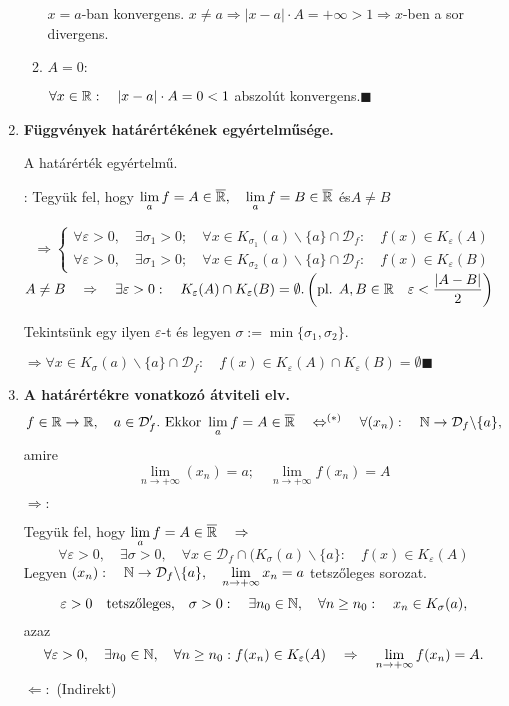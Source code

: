 \documentclass[a4paper,11.5pt]{article}
\begin{document}
\begin{enumerate}
\begin{enumerate}
			$ x=a$-ban konvergens. $x\not=a \Rightarrow |x-a|\cdot A=+\infty>1 \Rightarrow x$-ben a sor divergens.
			\item $A=0:$
			
			 $ \forall x\in\mathbb{R}:\quad |x-a|\cdot A=0<1$ abszolút konvergens.\quad $\blacksquare$
			
		\end{enumerate}
		
		\item \textbf{Függvények határértékének egyértelműsége.}
		
		A határérték egyértelmű.
		
		\biz: Tegyük fel, hogy $\displaystyle\lim_af=A\in\overline{\mathbb{R}}, \quad \lim_af=B\in \overline{\mathbb{R}}$ \quad és\quad  $A\not=B$
		
		\[\Rightarrow\left\{\begin{gathered}
			\forall \varepsilon>0, \quad \exists\sigma_1>0; \quad \forall x \in K_{\sigma_1}(a)\backslash\{a\}\cap \mathcal{D}_f:\quad f(x)\in K_{\varepsilon}(A)\\
			\forall \varepsilon>0, \quad \exists\sigma_1>0; \quad \forall x \in K_{\sigma_2}(a)\backslash\{a\}\cap \mathcal{D}_f:\quad f(x)\in K_{\varepsilon}(B)
		\end{gathered}\right.
		 \]
		$\displaystyle A\not=B\quad \Rightarrow\quad \exists\varepsilon>0:\quad K_\varepsilon(A)\cap K_\varepsilon(B)=\emptyset. \left(\text{pl. }A,B \in \mathbb{R} \quad \varepsilon<\displaystyle\frac{|A-B|}{2}\right)$
		
		Tekintsünk egy ilyen $\varepsilon$-t és legyen $\sigma:=\min\{\sigma_1,\sigma_2\}.$
		
		$\Rightarrow \forall x \in K_\sigma(a)\backslash\{a\}\cap\mathcal{D}_f:\quad f(x)\in K_\varepsilon(A)\cap K_\varepsilon(B)=\emptyset$\quad  {\LARGE\Lightning}\quad $\blacksquare$
		
		\item \textbf{A határértékre vonatkozó átviteli elv.}
		\[f\in\mathbb{R}\rightarrow\mathbb{R}, \quad a\in\mathcal{D}_f'.\text{ Ekkor }\lim_af=A\in\overline{\mathbb{R}}\quad \Leftrightarrow^{(*)}\quad \forall(x_n):\quad \mathbb{N}\to\mathcal{D}_f\backslash\{a\},\]
		amire
		\[\lim_{n\to+\infty}(x_n)=a;\quad \lim_{n\to+\infty}f(x_n)=A\]
		
		\biz $\Rightarrow:$
		
		Tegyük fel, hogy $\displaystyle\lim_af=A\in\overline{\mathbb{R}}\quad \Rightarrow$
		\[ \forall \varepsilon>0,\quad \exists \sigma>0,\quad \forall x \in \mathcal{D}_f\cap(K_\sigma(a)\backslash\{a\}:\quad f(x)\in K_\varepsilon(A) \]
		Legyen $\displaystyle(x_n):\quad \mathbb{N}\to\mathcal{D}_f\backslash\{a\},\quad  \lim_{n\to+\infty}x_n=a$ \quad tetszőleges sorozat.
		\[\varepsilon>0 \quad \text{tetszőleges,}\quad \sigma>0:\quad \exists n_0\in\mathbb{N},\quad \forall n\geq n_0:\quad x_n\in K_\sigma(a),\]
		azaz \[\forall\varepsilon>0,\quad  \exists n_0\in\mathbb{N},\quad \forall n\geq n_0: f(x_n)\in K_\varepsilon(A)\quad \Rightarrow\quad \lim_{n\to+\infty}f(x_n)=A.\]
		$\Leftarrow:$ (Indirekt)
		

\end{enumerate}
\end{document}
